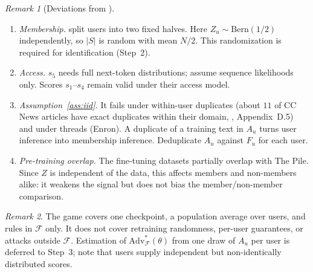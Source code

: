 \documentclass[11pt]{article}
\theoremstyle{remark}
\newtheorem{remark}{Remark}
\newcommand{\F}{\mathcal{F}}
\newcommand{\Adv}{\mathrm{Adv}}
\newcommand{\Bern}{\mathrm{Bern}}
\begin{document}
\begin{remark}[Deviations from \cite{kandpal2024}]\leavevmode
\begin{enumerate}[label=(\roman*)]
  \item \emph{Membership.} \cite{kandpal2024} split users into two fixed halves.
        Here $Z_u \sim \Bern(1/2)$ independently, so $|S|$ is random with mean $N/2$.
        This randomization is required for identification (Step~2).
  \item \emph{Access.} $s_5$ needs full next-token distributions; \cite{kandpal2024} assume
        sequence likelihoods only. Scores $s_1$--$s_4$ remain valid under their access model.
  \item \emph{Assumption~\ref{ass:iid}.} It fails under within-user duplicates
        (about $11$ of CC News articles have exact duplicates within their domain,
        \cite{kandpal2024}, Appendix~D.5) and under threads (Enron).
        A duplicate of a training text in $A_u$ turns user inference into membership inference.
        Deduplicate $A_u$ against $F_u$ for each user.
  \item \emph{Pre-training overlap.} The fine-tuning datasets partially overlap with The Pile.
        Since $Z$ is independent of the data, this affects members and non-members alike:
        it weakens the signal but does not bias the member/non-member comparison.
\end{enumerate}
\end{remark}

\begin{remark}
The game covers one checkpoint, a population average over users, and rules in $\F$ only.
It does not cover retraining randomness, per-user guarantees, or attacks outside $\F$.
Estimation of $\Adv^{*}_{\F}(\theta)$ from one draw of $A_u$ per user is deferred to Step~3;
note that users supply independent but non-identically distributed scores.
\end{remark}
\end{document}
